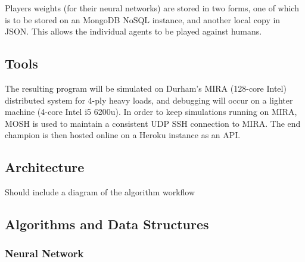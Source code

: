 \documentclass[12pt,a4paper]{article}
\begin{document}
Players weights (for their neural networks) are stored in two forms, one of which is to be stored on an MongoDB NoSQL instance, and another local copy in JSON. This allows the individual agents to be played against humans.

\subsection*{Tools}

The resulting program will be simulated on Durham's MIRA (128-core Intel) distributed system for 4-ply heavy loads, and debugging will occur on a lighter machine (4-core Intel i5 6200u). In order to keep simulations running on MIRA, MOSH is used to maintain a consistent UDP SSH connection to MIRA. The end champion is then hosted online on a Heroku instance as an API.

\subsection*{Architecture}

Should include a diagram of the algorithm workflow

\blindtext
\blindtext

\subsection*{Algorithms and Data Structures}

\subsubsection{Neural Network}
\end{document}
